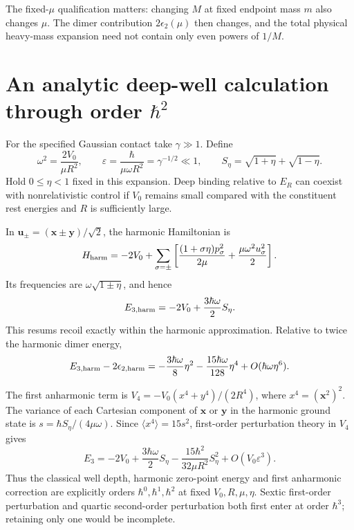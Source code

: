 The fixed-$\mu$ qualification matters: changing $M$ at fixed endpoint mass $m$ also changes $\mu$. The dimer contribution $2\epsilon_2(\mu)$ then changes, and the total physical heavy-mass expansion need not contain only even powers of $1/M$.

\section{An analytic deep-well calculation through order \texorpdfstring{$\hbar^2$}{hbar squared}}
\label{sec:deepwell}
For the specified Gaussian contact take $\gamma\gg1$. Define
\begin{equation}
 \omega^2=\frac{2V_0}{\mu R^2},\qquad
 \varepsilon=\frac{\hbar}{\mu\omega R^2}=\gamma^{-1/2}\ll1,\qquad
 S_\eta=\sqrt{1+\eta}+\sqrt{1-\eta}.
\end{equation}
Hold $0\leq\eta<1$ fixed in this expansion. Deep binding relative to $E_R$ can coexist with nonrelativistic control if $V_0$ remains small compared with the constituent rest energies and $R$ is sufficiently large.

In $\mathbf u_\pm=(\mathbf x\pm\mathbf y)/\sqrt2$, the harmonic Hamiltonian is
\begin{equation}
 H_{\rm harm}=-2V_0+
 \sum_{\sigma=\pm}\left[
 \frac{(1+\sigma\eta)p_\sigma^2}{2\mu}
 +\frac{\mu\omega^2u_\sigma^2}{2}
 \right].
\end{equation}
Its frequencies are $\omega\sqrt{1\pm\eta}$, and hence
\begin{equation}
 E_{3,{\rm harm}}=-2V_0+\frac{3\hbar\omega}{2}S_\eta .
 \label{eq:harmonic}
\end{equation}
This resums recoil exactly within the harmonic approximation. Relative to twice the harmonic dimer energy,
\begin{equation}
 E_{3,{\rm harm}}-2\epsilon_{2,{\rm harm}}
 =-\frac{3\hbar\omega}{8}\eta^2
  -\frac{15\hbar\omega}{128}\eta^4+O(\hbar\omega\eta^6).
\end{equation}

The first anharmonic term is
$V_4=-V_0(x^4+y^4)/(2R^4)$, where $x^4=(\mathbf x^2)^2$.
The variance of each Cartesian component of $\mathbf x$ or $\mathbf y$ in the harmonic ground state is
$s=\hbar S_\eta/(4\mu\omega)$. Since $\langle x^4\rangle=15s^2$, first-order perturbation theory in $V_4$ gives
\begin{equation}
 \boxed{
 E_3=-2V_0+\frac{3\hbar\omega}{2}S_\eta
 -\frac{15\hbar^2}{32\mu R^2}S_\eta^2
 +O(V_0\varepsilon^3).}
 \label{eq:hbar-result}
\end{equation}
Thus the classical well depth, harmonic zero-point energy and first anharmonic correction are explicitly orders $\hbar^0,\hbar^1,\hbar^2$ at fixed $V_0,R,\mu,\eta$. Sextic first-order perturbation and quartic second-order perturbation both first enter at order $\hbar^3$; retaining only one would be incomplete.

